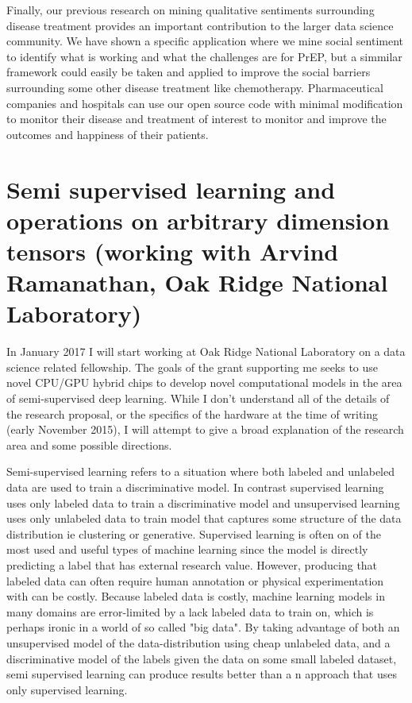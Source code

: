 Finally, our previous research on mining qualitative sentiments surrounding disease treatment provides an important contribution to the larger data science community. We have shown a specific application where we mine social sentiment to identify what is working and what the challenges are for PrEP, but a simmilar framework could easily be taken and applied to improve the social barriers surrounding some other disease treatment like chemotherapy. Pharmaceutical companies and hospitals can use our open source code with minimal modification to monitor their disease and treatment of interest to monitor and improve the outcomes and happiness of their patients.


\section{Semi supervised learning and operations on arbitrary dimension tensors (working with Arvind Ramanathan, Oak Ridge National Laboratory)}

In January 2017 I will start working at Oak Ridge National Laboratory on a data science related fellowship. The goals of the grant supporting me seeks to use novel CPU/GPU hybrid chips to develop novel computational models in the area of semi-supervised deep learning. While I don't understand all of the details of the research proposal, or the specifics of the hardware at the time of writing (early November 2015), I will attempt to give a broad explanation of the research area and some possible directions.

Semi-supervised learning refers to a situation where both labeled and unlabeled data are used to train a discriminative model\cite{zhu2011semi}. In contrast supervised learning uses only labeled data to train a discriminative model and unsupervised learning uses only unlabeled data to train model that captures some structure of the data distribution ie clustering or generative. Supervised learning is often on of the most used and useful types of machine learning since the model is directly predicting a label that has external research value. However, producing that labeled data can often require human annotation or physical experimentation with can be costly. Because labeled data is costly, machine learning models in many domains are error-limited by a lack labeled data to train on\cite{guillaumin2010multimodal}, which is perhaps ironic in a world of so called "big data". By taking advantage of both an unsupervised model of the data-distribution using cheap unlabeled data, and a discriminative model of the labels given the data on some small labeled dataset, semi supervised learning can produce results better than a n approach that uses only supervised learning.

